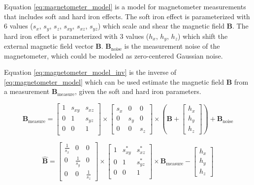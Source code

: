 Equation \ref{eq:magnetometer_model} is a model for magnetometer measurements that includes soft and hard iron effects. The soft iron effect is parameterized with 6 values ($s_x$, $s_y$, $s_z$, $s_{xy}$, $s_{xz}$, $s_{yz}$) which scale and shear the magnetic field $\bm{B}$. The hard iron effect is parameterized with 3 values ($h_x$, $h_y$, $h_z$) which shift the external magnetic field vector $\bm{B}$. $\bm{B}_\text{noise}$ is the measurement noise of the magnetometer, which could be modeled as zero-centered Gaussian noise.\cite{vectornav}

Equation \ref{eq:magnetometer_model_inv} is the inverse of \ref{eq:magnetometer_model} which can be used estimate the magnetic field $\bm{B}$ from a measurement $\bm{B}_\text{measure}$, given the soft and hard iron parameters.

\begin{equation}
\label{eq:magnetometer_model}
    \bm{B}_\text{measure} = \left[\begin{matrix}
    1 & s_{xy} & s_{xz}\\
    0 & 1 & s_{yz}\\
    0 & 0 & 1\\
    \end{matrix}\right] \times \left[\begin{matrix}
    s_x & 0 & 0\\
    0 & s_y & 0\\
    0 & 0 & s_z\end{matrix}\right] \times \left(\bm{B} + \left[\begin{matrix}h_x\\h_y\\h_z\end{matrix}\right]\right) + \bm{B}_\text{noise}
\end{equation}

\begin{equation}
\label{eq:magnetometer_model_inv}
    \hat{\bm{B}} = \left[\begin{matrix}
    \frac{1}{s_x} & 0 & 0\\
    0 & \frac{1}{s_y} & 0\\
    0 & 0 & \frac{1}{s_z}\end{matrix}\right] \times \left[\begin{matrix}
    1 & s_{xy}^* & s_{xz}^*\\
    0 & 1 & s_{yz}^*\\
    0 & 0 & 1\\
    \end{matrix}\right] \times \bm{B}_\text{measure} - \left[\begin{matrix}h_x\\h_y\\h_z\end{matrix}\right]
\end{equation}

